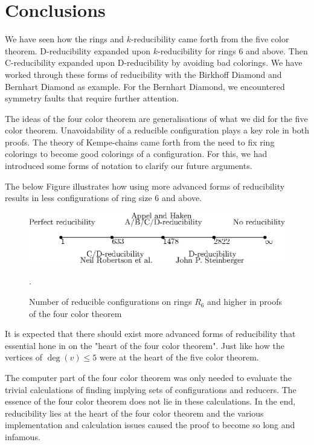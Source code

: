 \pagebreak
\section{Conclusions}

We have seen how the rings and $k$-reducibility came forth from the five color theorem. D-reducibility expanded upon $k$-reducibility for rings 6 and above. Then C-reducibility expanded upon D-reducibility by avoiding bad colorings. We have worked through these forms of reducibility with the Birkhoff Diamond and Bernhart Diamond as example. For the Bernhart Diamond, we encountered symmetry faults that require further attention.

The ideas of the four color theorem are generalisations of what we did for the five color theorem. Unavoidability of a reducible configuration plays a key role in both proofs. The theory of Kempe-chains came forth from the need to fix ring colorings to become good colorings of a configuration. For this, we had introduced some forms of notation to clarify our future arguments.

The below Figure illustrates how using more advanced forms of reducibility results in less configurations of ring size 6 and above.

\begin{figure}[!h]
    \centering
    \includegraphics[width=1.0\textwidth]{../beamer/images/reduce.eps}
    \caption{Number of reducible configurations on rings $R_6$ and higher in proofs of the four color theorem}.
\end{figure}

It is expected that there should exist more advanced forms of reducibility that essential hone in on the "heart of the four color theorem". Just like how the vertices of $\deg(v)\leq 5$ were at the heart of the five color theorem. 

The computer part of the four color theorem was only needed to evaluate the trivial calculations of finding implying sets of configurations and reducers. The essence of the four color theorem does not lie in these calculations. In the end, reducibility lies at the heart of the four color theorem and the various implementation and calculation issues caused the proof to become so long and infamous.